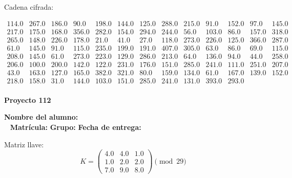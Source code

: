 \documentclass[12pt]{article}
\begin{document}
Cadena cifrada:
\begin{center}
$\begin{array}{lllllllllllll}
114.0 & 267.0 & 186.0 & 90.0 & 198.0 & 144.0 & 125.0 & 288.0 & 215.0 & 91.0 & 152.0 & 97.0 & 145.0\\
217.0 & 175.0 & 168.0 & 356.0 & 282.0 & 154.0 & 294.0 & 244.0 & 56.0 & 103.0 & 86.0 & 157.0 & 318.0\\
265.0 & 148.0 & 226.0 & 178.0 & 21.0 & 41.0 & 27.0 & 118.0 & 273.0 & 226.0 & 125.0 & 366.0 & 287.0\\
61.0 & 145.0 & 91.0 & 115.0 & 235.0 & 199.0 & 191.0 & 407.0 & 305.0 & 63.0 & 86.0 & 69.0 & 115.0\\
208.0 & 145.0 & 61.0 & 273.0 & 223.0 & 129.0 & 286.0 & 213.0 & 64.0 & 136.0 & 94.0 & 44.0 & 258.0\\
206.0 & 100.0 & 200.0 & 142.0 & 122.0 & 231.0 & 176.0 & 151.0 & 285.0 & 241.0 & 111.0 & 251.0 & 207.0\\
43.0 & 163.0 & 127.0 & 165.0 & 382.0 & 321.0 & 80.0 & 159.0 & 134.0 & 61.0 & 167.0 & 139.0 & 152.0\\
218.0 & 158.0 & 31.0 & 144.0 & 103.0 & 151.0 & 285.0 & 241.0 & 131.0 & 393.0 & 293.0\\
\end{array}$
\end{center}

\newpage


\textbf{Proyecto 112}

\textbf{Nombre del alumno:} \underline{\hspace{13cm}}\\\
\vspace{1cm}
\textbf{Matrícula:} \underline{\hspace{4cm}} \hspace{1cm}
\textbf{Grupo:} \underline{\hspace{2cm}}
\textbf{Fecha de entrega:} \underline{\hspace{2cm}}

\medskip

Matriz llave:
\[
K = \begin{pmatrix}
4.0 & 4.0 & 1.0\\
1.0 & 2.0 & 2.0\\
7.0 & 9.0 & 8.0
\end{pmatrix} \pmod{29}
\]
\end{document}
